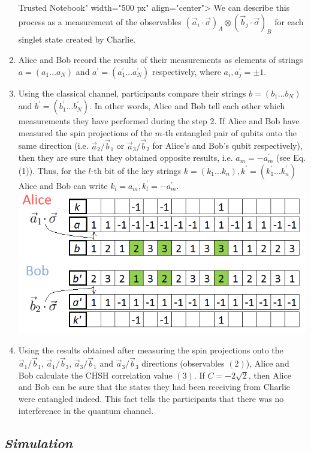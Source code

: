 \documentclass[11pt]{article}
\makeatletter
\def\maxwidth{\ifdim\Gin@nat@width>\linewidth\linewidth
    \else\Gin@nat@width\fi}
\let\Oldincludegraphics\includegraphics
\renewcommand{\includegraphics}[1]{\Oldincludegraphics[width=.8\maxwidth]{#1}}
\makeatother
\begin{document}
\begin{enumerate}
   Trusted Notebook" width="500 px" align="center"\textgreater{} We can
  describe this process as a measurement of the observables
  \((\vec{a}_i \cdot \vec{\sigma})_A \otimes (\vec{b}_j \cdot \vec{\sigma})_B\)
  for each singlet state created by Charlie.
\item
  Alice and Bob record the results of their measurements as elements of
  strings \(a=(a_1 \ldots a_N)\) and \(a^{'} =(a_1^{'} \ldots a_N^{'})\)
  respectively, where \(a_i, a^{'}_j = \pm 1\).
\item
  Using the classical channel, participants compare their strings
  \(b=(b_1 \ldots b_N)\) and \(b^{'}=(b_1^{'} \ldots b_N^{'})\). In
  other words, Alice and Bob tell each other which measurements they
  have performed during the step 2. If Alice and Bob have measured the
  spin projections of the \(m\)-th entangled pair of qubits onto the
  same direction (i.e. \(\vec{a}_2/\vec{b}_1\) or
  \(\vec{a}_3/\vec{b}_2\) for Alice's and Bob's qubit respectively),
  then they are sure that they obtained opposite results, i.e.
  \(a_m = - a_m^{'}\) (see Eq. (1)). Thus, for the \(l\)-th bit of the
  key strings \(k=(k_1 \ldots k_n),k^{'}=(k_1^{'} \ldots k_n^{'})\)
  Alice and Bob can write \(k_l = a_m, k_l^{'} = -a_m^{'}\).
  \includegraphics{images/step3-4strings.png}
\item
  Using the results obtained after measuring the spin projections onto
  the \(\vec{a}_1/\vec{b}_1\), \(\vec{a}_1/\vec{b}_3\),
  \(\vec{a}_3/\vec{b}_1\) and \(\vec{a}_3/\vec{b}_3\) directions
  (observables \((2)\)), Alice and Bob calculate the CHSH correlation
  value \((3)\). If \(C = -2\sqrt{2}\), then Alice and Bob can be sure
  that the states they had been receiving from Charlie were entangled
  indeed. This fact tells the participants that there was no
  interference in the quantum channel.
\end{enumerate}

    \subsection{\texorpdfstring{\emph{Simulation}}{Simulation}}\label{simulation}
\end{document}
